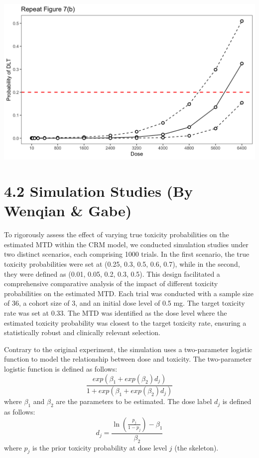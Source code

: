 \documentclass[
]{article}
\begin{document}
\includegraphics{fig.7.rep.dfcrm.png}

\hypertarget{simulation-studies-by-wenqian-gabe}{%
\section{4.2 Simulation Studies (By Wenqian \&
Gabe)}\label{simulation-studies-by-wenqian-gabe}}

To rigorously assess the effect of varying true toxicity probabilities
on the estimated MTD within the CRM model, we conducted simulation
studies under two distinct scenarios, each comprising 1000 trials. In
the first scenario, the true toxicity probabilities were set at (0.25,
0.3, 0.5, 0.6, 0.7), while in the second, they were defined as (0.01,
0.05, 0.2, 0.3, 0.5). This design facilitated a comprehensive
comparative analysis of the impact of different toxicity probabilities
on the estimated MTD. Each trial was conducted with a sample size of 36,
a cohort size of 3, and an initial dose level of 0.5 mg. The target
toxicity rate was set at 0.33. The MTD was identified as the dose level
where the estimated toxicity probability was closest to the target
toxicity rate, ensuring a statistically robust and clinically relevant
selection.

Contrary to the original experiment, the simulation uses a two-parameter
logistic function to model the relationship between dose and toxicity.
The two-parameter logistic function is defined as follows: \[
\frac{exp(\beta_1+exp(\beta_2)d_j)}{1+exp(\beta_1+exp(\beta_2)d_j)}
\] where \(\beta_1\) and \(\beta_2\) are the parameters to be estimated.
The dose label \(d_j\) is defined as follows: \[
d_j=\frac{\ln(\frac{p_j}{1-p_j})-\beta_1}{\beta_2}
\] where \(p_j\) is the prior toxicity probability at dose level \(j\)
(the skeleton).
\end{document}
